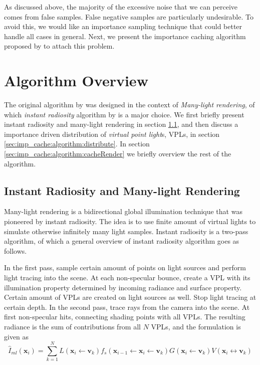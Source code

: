 \documentclass[]{book}
\begin{document}
As discussed above, the majority of the excessive noise that we can perceive comes from false samples.
False negative samples are particularly undesirable.
To avoid this, we would like an importance sampling technique that could better handle all cases in general.
Next, we present the importance caching algorithm proposed by \citeauthor{georgiev2012importance} to attach this problem.

\section{Algorithm Overview}
\label{sec:imp_cache:algorithm}
The original algorithm by \citeauthor{georgiev2012importance} was designed in the context of \textit{Many-light rendering}, of which \textit{instant radiosity} algorithm by \citeauthor{keller1997VPL} \cite{keller1997VPL} is a major choice.
We first briefly present instant radiosity and many-light rendering in section \ref{sec:imp_cache:algorithm:IR}, and then discuss a importance driven distribution of \textit{virtual point light}s, VPLs, in section \ref{sec:imp_cache:algorithm:distribute}.
In section \ref{sec:imp_cache:algorithm:cacheRender} we briefly overview the rest of the algorithm.

\subsection{Instant Radiosity and Many-light Rendering}
\label{sec:imp_cache:algorithm:IR}
Many-light rendering is a bidirectional global illumination technique that was pioneered by instant radiosity.
The idea is to use finite amount of virtual lights to simulate otherwise infinitely many light samples.
Instant radiosity is a two-pass algorithm, of which a general overview of instant radiosity algorithm goes as follows.

In the first pass, sample certain amount of points on light sources and perform light tracing into the scene.
At each non-specular bounce, create a VPL with its illumination property determined by incoming radiance and surface property.
Certain amount of VPLs are created on light sources as well.
Stop light tracing at certain depth.
In the second pass, trace rays from the camera into the scene.
At first non-specular hits, connecting shading points with all VPLs.
The resulting radiance is the sum of contributions from all $N$ VPLs, and the formulation is given as
\begin{equation}
	\widehat{I}_{ml}(\textbf{x}_i) = \sum_{k=1}^{N}L(\textbf{x}_i \leftarrow \textbf{v}_k) f_s(\textbf{x}_{i-1} \leftarrow \textbf{x}_i \leftarrow \textbf{v}_k) G(\textbf{x}_i \leftarrow \textbf{v}_k) V(\textbf{x}_i \leftrightarrow \textbf{v}_k)
	\label{eq:IMP:ML}
\end{equation}
\end{document}
